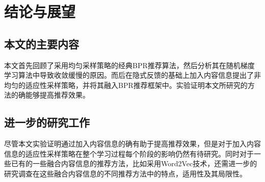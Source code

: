 \section{结论与展望}

\subsection{本文的主要内容}

本文首先回顾了采用均匀采样策略的经典BPR推荐算法，然后分析其在随机梯度学习算法中导致收敛缓慢的原因。而后在隐式反馈的基础上加入内容信息提出了非均匀的适应性采样策略，并将其融入BPR推荐框架中。实验证明本文所研究的方法的确能够提高推荐效果。

\subsection{进一步的研究工作}
尽管本文实验证明通过加入内容信息的确有助于提高推荐效果，但是对于加入内容信息的适应性采样策略在整个学习过程每个阶段的影响仍然有待研究。同时对于一些已有的一些融合内容信息的推荐方法，比如采用Word2Vec技术，还需进一步的研究调查在这些融合内容信息的不同推荐方法中的特点，适用性及其局限性。